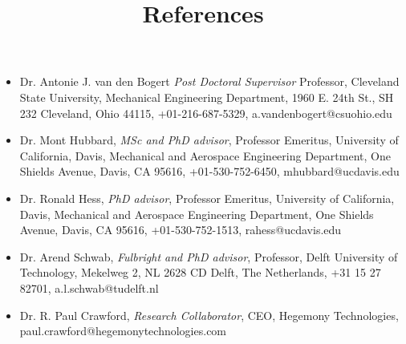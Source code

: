 \documentclass{article}
\title{References}
\date{}
\begin{document}
\maketitle

\begin{itemize}
  \item Dr. Antonie J. van den Bogert
    \emph{Post Doctoral Supervisor}
    Professor,
    Cleveland State University,
    Mechanical Engineering Department,
    1960 E. 24th St., SH 232
    Cleveland, Ohio 44115,
    +01-216-687-5329,
    a.vandenbogert@csuohio.edu
  \item Dr. Mont Hubbard,
    \emph{MSc and PhD advisor},
    Professor Emeritus,
    University of California, Davis,
    Mechanical and Aerospace Engineering Department,
    One Shields Avenue, Davis, CA 95616,
    +01-530-752-6450,
    mhubbard@ucdavis.edu
  \item Dr. Ronald Hess,
    \emph{PhD advisor},
    Professor Emeritus,
    University of California, Davis,
    Mechanical and Aerospace Engineering Department,
    One Shields Avenue, Davis, CA 95616,
    +01-530-752-1513,
    rahess@ucdavis.edu
  \item Dr. Arend Schwab,
    \emph{Fulbright and PhD advisor},
    Professor,
    Delft University of Technology,
    Mekelweg 2, NL 2628 CD Delft, The Netherlands,
    +31 15 27 82701,
    a.l.schwab@tudelft.nl
  \item Dr. R. Paul Crawford, \emph{Research Collaborator}, CEO, Hegemony
    Technologies, \\ paul.crawford@hegemonytechnologies.com
\end{itemize}
\end{document}

